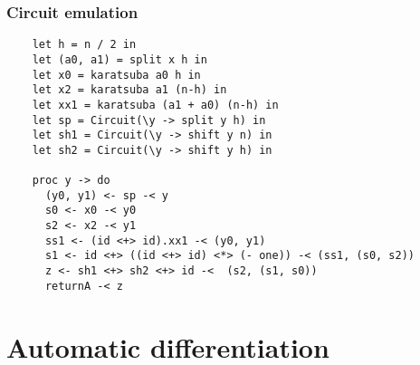 \documentclass[10pt]{beamer}
\begin{document}

\begin{frame}[fragile]
  \frametitle{Circuit emulation}

  \begin{lstlisting}
    let h = n / 2 in
    let (a0, a1) = split x h in
    let x0 = karatsuba a0 h in
    let x2 = karatsuba a1 (n-h) in
    let xx1 = karatsuba (a1 + a0) (n-h) in
    let sp = Circuit(\y -> split y h) in
    let sh1 = Circuit(\y -> shift y n) in
    let sh2 = Circuit(\y -> shift y h) in
    
    proc y -> do
      (y0, y1) <- sp -< y 
      s0 <- x0 -< y0
      s2 <- x2 -< y1
      ss1 <- (id <+> id).xx1 -< (y0, y1)
      s1 <- id <+> ((id <+> id) <*> (- one)) -< (ss1, (s0, s2))
      z <- sh1 <+> sh2 <+> id -<  (s2, (s1, s0))
      returnA -< z
  \end{lstlisting}
\end{frame}


\section{Automatic differentiation}
\end{document}

